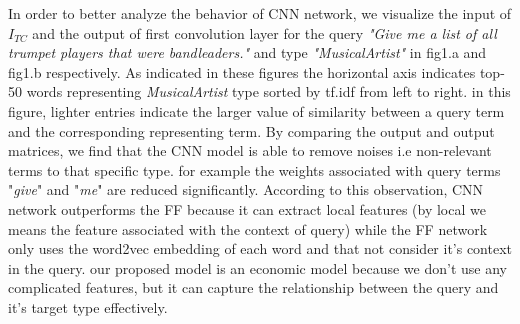 In order to better analyze the behavior of CNN network, we visualize the input of $I_{TC}$ and the output of first convolution layer for the query \textit{"Give me a list of all trumpet players that were bandleaders."} and type \textit{"MusicalArtist"} in fig1.a and fig1.b respectively. As indicated in these figures the horizontal axis indicates top-50 words representing \textit{MusicalArtist} type sorted by tf.idf from left to right. in this figure, lighter entries indicate the larger value of similarity between a query term and the corresponding representing term. By comparing the output and output matrices, we find that the CNN model is able to remove noises i.e non-relevant terms to that specific type. for example the weights associated with query terms "\textit{give}" and "\textit{me}" are reduced significantly. According to this observation, CNN network outperforms the FF because it can extract local features (by local we means the feature associated with the context of query) while the FF network only uses the word2vec embedding of each word and that not consider it's context in the query. our proposed model is an economic model because we don't use any complicated features, but it can capture the relationship between the query and it's target type effectively.     




\begin{table}[]
	\caption{Target type detection performance.}
\end{table}

